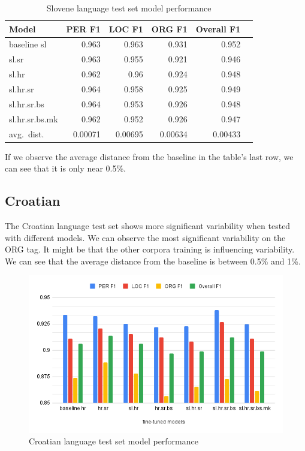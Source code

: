 \documentclass[sigconf]{acmart}
\begin{document}
\begin{table}[H]
  \caption{Slovene language test set model performance}
  \label{tab:eval_sl}
  \begin{tabular}{lrrrrr}
    \toprule
    Model&PER F1&LOC F1&ORG F1&Overall F1\\
    \midrule
    baseline sl&0.963&0.963&0.931&0.952\\
    \midrule
    sl.sr&0.963&0.955&0.921&0.946\\
    sl.hr&0.962&0.96&0.924&0.948\\
    sl.hr.sr&0.964&0.958&0.925&0.949\\
    sl.hr.sr.bs&0.964&0.953&0.926&0.948\\
    sl.hr.sr.bs.mk&0.962&0.952&0.926&0.947\\
    \midrule
    avg.\ dist.&0.00071&0.00695&0.00634&0.00433\\
    \bottomrule
  \end{tabular}
\end{table}

If we observe the average distance from the baseline in the table's last row, we can see that it is only near 0.5\%.

\subsection{Croatian}
\label{subsec:croatian}

The Croatian language test set shows more significant variability when tested with different models.
We can observe the most significant variability on the ORG tag.
It might be that the other corpora training is influencing variability.
We can see that the average distance from the baseline is between 0.5\% and 1\%.
\begin{figure}[h]
  \caption{Croatian language test set model performance}
  \label{fig:eval_hr}
  \centering
  \includegraphics[width=\linewidth]{eval_hr}
\end{figure}
\end{document}
